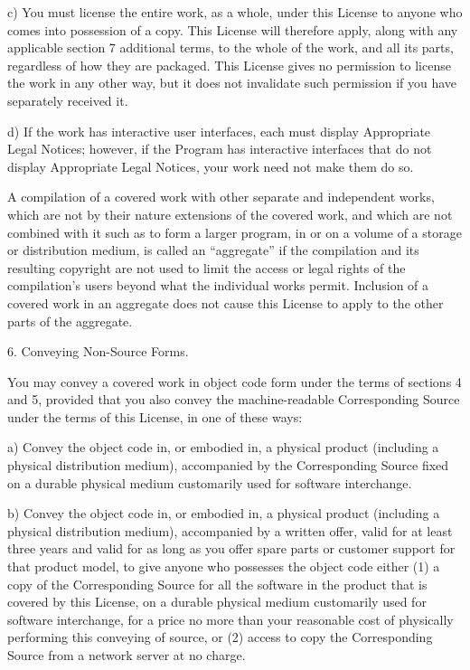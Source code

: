     c) You must license the entire work, as a whole, under this
    License to anyone who comes into possession of a copy.  This
    License will therefore apply, along with any applicable section 7
    additional terms, to the whole of the work, and all its parts,
    regardless of how they are packaged.  This License gives no
    permission to license the work in any other way, but it does not
    invalidate such permission if you have separately received it.

    d) If the work has interactive user interfaces, each must display
    Appropriate Legal Notices; however, if the Program has interactive
    interfaces that do not display Appropriate Legal Notices, your
    work need not make them do so.

  A compilation of a covered work with other separate and independent
works, which are not by their nature extensions of the covered work,
and which are not combined with it such as to form a larger program,
in or on a volume of a storage or distribution medium, is called an
``aggregate'' if the compilation and its resulting copyright are not
used to limit the access or legal rights of the compilation's users
beyond what the individual works permit.  Inclusion of a covered work
in an aggregate does not cause this License to apply to the other
parts of the aggregate.

  6. Conveying Non-Source Forms.

  You may convey a covered work in object code form under the terms
of sections 4 and 5, provided that you also convey the
machine-readable Corresponding Source under the terms of this License,
in one of these ways:

    a) Convey the object code in, or embodied in, a physical product
    (including a physical distribution medium), accompanied by the
    Corresponding Source fixed on a durable physical medium
    customarily used for software interchange.

    b) Convey the object code in, or embodied in, a physical product
    (including a physical distribution medium), accompanied by a
    written offer, valid for at least three years and valid for as
    long as you offer spare parts or customer support for that product
    model, to give anyone who possesses the object code either (1) a
    copy of the Corresponding Source for all the software in the
    product that is covered by this License, on a durable physical
    medium customarily used for software interchange, for a price no
    more than your reasonable cost of physically performing this
    conveying of source, or (2) access to copy the
    Corresponding Source from a network server at no charge.

